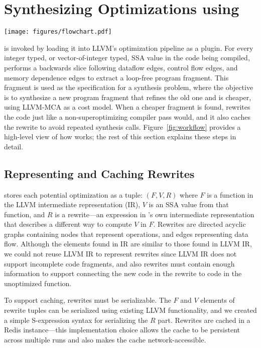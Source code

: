 \section{Synthesizing Optimizations using \tool}
\label{sec:rewrite}

\begin{figure*}[tbp]
    \texttt{[image: figures/flowchart.pdf]}
    \caption{Overview of how \tool{} works, and how it fits into the
      LLVM optimization pipeline}
    \label{fig:workflow}
\end{figure*}

\tool{} is invoked by loading it into LLVM's optimization pipeline as
a plugin.
%
For every integer typed, or vector-of-integer typed, SSA value in the
code being compiled, \tool{} performs a backwards slice following
dataflow edges, control flow edges, and memory dependence edges to
extract a loop-free program fragment.
%
This fragment is used as the specification for a synthesis problem,
where the objective is to synthesize a new program fragment that
refines the old one and is cheaper, using
LLVM-MCA as a cost model.
%
When a cheaper fragment is found, \tool{} rewrites the code just like
a non-superoptimizing compiler pass would, and it also caches the
rewrite to avoid repeated synthesis calls.
%
Figure~\ref{fig:workflow} provides a high-level view of how \tool{}
works; the rest of this section explains these steps in detail.


\subsection{Representing and Caching Rewrites}

\tool{} stores each potential optimization as a tuple: $(F, V, R)$
where $F$ is a function in the LLVM intermediate representation (IR),
$V$ is an SSA value from that function, and $R$ is a rewrite---an
expression in \tool's own intermediate representation that describes a
different way to compute $V$ in $F$.
%
Rewrites are directed acyclic graphs containing nodes that represent
operations, and edges representing data flow.
%
Although the elements found in \tool{} IR are similar to those found
in LLVM IR, we could not reuse LLVM IR to represent rewrites since
LLVM IR does not support incomplete code fragments, and also rewrites
must contain enough information to support connecting the new code in
the rewrite to code in the unoptimized function.


To support caching, rewrites must be serializable.
%
The $F$ and $V$ elements of rewrite tuples can be serialized using
existing LLVM functionality, and we created a simple S-expression
syntax for serializing the $R$ part.
%
Rewrites are cached in a Redis instance---this implementation choice
allows the cache to be persistent across multiple \tool{} runs and also
makes the cache network-accessible.


